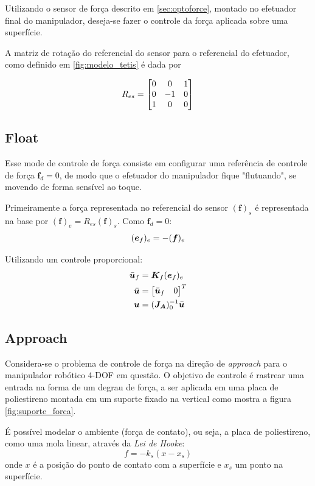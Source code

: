 Utilizando o sensor de força descrito em \ref{sec:optoforce}, montado no efetuador final do manipulador, deseja-se fazer o controle da força aplicada sobre uma superfície. 

A matriz de rotação do referencial do sensor para o referencial do efetuador, como definido em \ref{fig:modelo_tetis} é dada por

\begin{equation}
R_{es} = \begin{bmatrix}
  0 & 0 & 1 \\
  0 & -1 & 0 \\
  1 & 0 & 0
\end{bmatrix}
\end{equation}

\subsection{Float}
Esse mode de controle de força consiste em configurar uma referência de controle de força $\bm{f}_d = 0$, de modo que o efetuador do manipulador fique "flutuando", se movendo de forma sensível ao toque.

Primeiramente a força representada no referencial do sensor $(\bm{f})_s$ é representada na base por $(\bm{f})_e = R_{es} (\bm{f})_s$.
Como $\bm{f}_d = 0$:
\begin{equation}
(\bm{e}_f)_e = - (\bm{f})_e \\
\end{equation}

Utilizando um controle proporcional:
\begin{align}
\bar{\bm{u}}_f &= \bm{K}_f (\bm{e}_f)_e \\
\bar{\bm{u}} &= \begin{bmatrix} \bar{\bm{u}}_f & 0\end{bmatrix}^T\\
\bm{u} &= (\bm{J_A})_0^{-1} \bar{\bm{u}}
\end{align}

\subsection{Approach}
Considera-se o problema de controle de força na direção de \textit{approach} para o manipulador robótico 4-DOF em questão. O objetivo de controle é rastrear uma entrada na forma de um degrau de força, a ser aplicada em uma placa de poliestireno montada em um suporte fixado na vertical como mostra a figura \ref{fig:suporte_forca}.  

É possível modelar o ambiente (força de contato), ou seja, a placa de poliestireno, como uma mola linear, através da \textit{Lei de Hooke}: 
\begin{equation}
f = -k_s (x - x_s)
\end{equation}
onde $x$ é a posição do ponto de contato com a superfície e $x_s$ um ponto na superfície.

